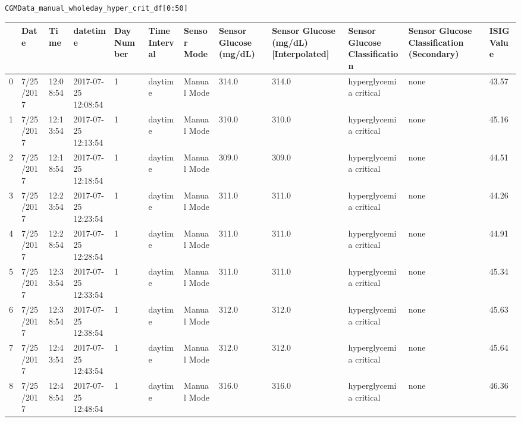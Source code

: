 \bigskip

\begin{verbatim}
CGMData_manual_wholeday_hyper_crit_df[0:50]
\end{verbatim}

\bigskip\noindent
\begin{tabular}{p{}p{}p{}p{}p{}p{}p{}p{}p{}p{}p{}p{}}
\toprule
 & Date & Time & datetime & Day Number & Time Interval & Sensor Mode & Sensor Glucose (mg/dL) & Sensor Glucose (mg/dL) [Interpolated] & Sensor Glucose Classification & Sensor Glucose Classification (Secondary) & ISIG Value \\
\hline
0 & 7/25/2017 & 12:08:54 & 2017-07-25 12:08:54 & 1 & daytime & Manual Mode & 314.0 & 314.0 & hyperglycemia critical & none & 43.57 \\
\hline
1 & 7/25/2017 & 12:13:54 & 2017-07-25 12:13:54 & 1 & daytime & Manual Mode & 310.0 & 310.0 & hyperglycemia critical & none & 45.16 \\
\hline
2 & 7/25/2017 & 12:18:54 & 2017-07-25 12:18:54 & 1 & daytime & Manual Mode & 309.0 & 309.0 & hyperglycemia critical & none & 44.51 \\
\hline
3 & 7/25/2017 & 12:23:54 & 2017-07-25 12:23:54 & 1 & daytime & Manual Mode & 311.0 & 311.0 & hyperglycemia critical & none & 44.26 \\
\hline
4 & 7/25/2017 & 12:28:54 & 2017-07-25 12:28:54 & 1 & daytime & Manual Mode & 311.0 & 311.0 & hyperglycemia critical & none & 44.91 \\
\hline
5 & 7/25/2017 & 12:33:54 & 2017-07-25 12:33:54 & 1 & daytime & Manual Mode & 311.0 & 311.0 & hyperglycemia critical & none & 45.34 \\
\hline
6 & 7/25/2017 & 12:38:54 & 2017-07-25 12:38:54 & 1 & daytime & Manual Mode & 312.0 & 312.0 & hyperglycemia critical & none & 45.63 \\
\hline
7 & 7/25/2017 & 12:43:54 & 2017-07-25 12:43:54 & 1 & daytime & Manual Mode & 312.0 & 312.0 & hyperglycemia critical & none & 45.64 \\
\hline
8 & 7/25/2017 & 12:48:54 & 2017-07-25 12:48:54 & 1 & daytime & Manual Mode & 316.0 & 316.0 & hyperglycemia critical & none & 46.36 \\

\end{tabular}
